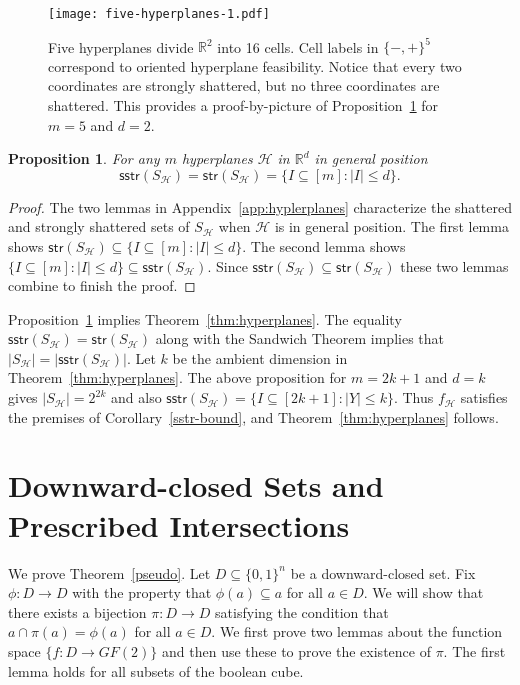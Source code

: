 \documentclass[11pt]{article}
\newtheorem{proposition}[theorem]{Proposition}
\theoremstyle{definition}
\newcommand{\1}{\mathbf{1}}
\newcommand{\R}{{\mathbb R}}
\renewcommand{\leq}{\leqslant}
\newcommand{\sstr}{\mathsf{sstr}}
\newcommand{\str}{\mathsf{str}}
\begin{document}
\begin{figure}[t]
\begin{center}
\texttt{[image: five-hyperplanes-1.pdf]}
\caption{Five hyperplanes divide $\mathbb{R}^2$ into 16 cells.  Cell labels in $\{-,+\}^5$ correspond to oriented hyperplane feasibility.   Notice that every two coordinates are strongly shattered, but no three coordinates are shattered. This provides a proof-by-picture of Proposition~\ref{thm:hyp-extremal} for $m=5$ and $d=2$.} \label{fig2}
\end{center}
\end{figure}

\begin{proposition}\label{thm:hyp-extremal}
For any $m$ hyperplanes $\mathcal{H}$ in $\R^d$ in general position 
$$\sstr(S_\mathcal{H}) = \str(S_\mathcal{H}) = \{I\subseteq [m] : |I|\leq d\}.$$
\end{proposition}
\begin{proof}
The two lemmas in Appendix~\ref{app:hyplerplanes} characterize the shattered and strongly shattered
sets of $S_\mathcal{H}$ when $\mathcal{H}$ is in general position. 
The first lemma shows  $\str(S_\mathcal{H})\subseteq\{I\subseteq [m] : |I|\leq d\}$. The second lemma shows $\{I\subseteq [m] : |I|\leq d\}\subseteq\sstr(S_\mathcal{H})$.
Since $\sstr(S_\mathcal{H})\subseteq\str(S_\mathcal{H})$
these two lemmas combine to finish the proof.
\end{proof}

Proposition~\ref{thm:hyp-extremal} implies Theorem~\ref{thm:hyperplanes}. 
The equality $\sstr(S_\mathcal{H}) = \str(S_\mathcal{H})$ along with the Sandwich Theorem implies that $|S_\mathcal{H}|=|\sstr(S_\mathcal{H})|$.  Let $k$ be the ambient dimension in Theorem~\ref{thm:hyperplanes}.   The above proposition for  $m=2k+1$ and $d=k$ gives $\lvert S_\mathcal{H}\rvert = 2^{2k}$ and also $\sstr(S_\mathcal{H})=\{I\subseteq [2k+1] : \lvert Y\rvert\leq k\}$. Thus $f_\mathcal{H}$ satisfies the premises of Corollary~\ref{sstr-bound}, and Theorem~\ref{thm:hyperplanes} follows.

\section{Downward-closed Sets and Prescribed Intersections}\label{sec:pseudo}\label{section:downward-closed}
We prove Theorem~\ref{pseudo}.   Let $D\subseteq \{0,1\}^n$ be a downward-closed set. Fix $\phi : D\to D$ with the property that $\phi(a) \subseteq a$ for all $a \in D$.    We will show that there exists a bijection $\pi : D\to D$ satisfying the condition that $a \cap \pi(a) = \phi(a)$ for all $a\in D$.     We first prove two lemmas about the function space $\{f:D \to GF(2)\}$ and then use these to prove the existence of $\pi$.   The first lemma holds for all subsets of the boolean cube.
\end{document}
